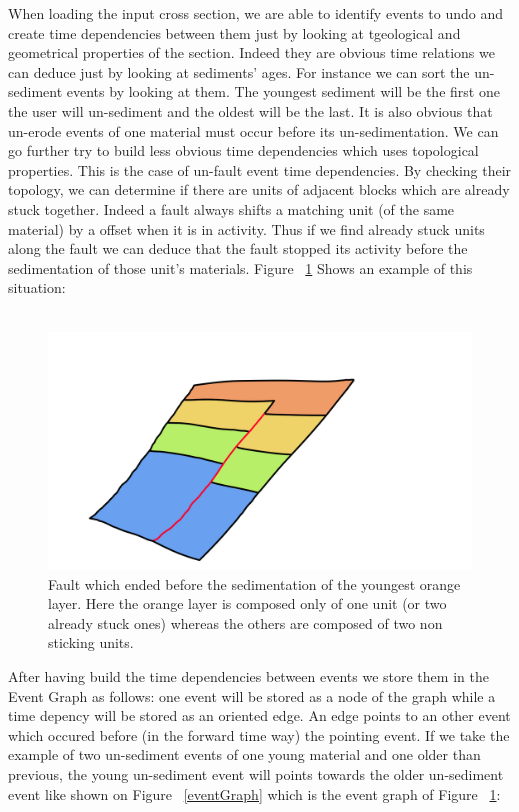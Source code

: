 \documentclass[12pt, a4paper]{report} %
\begin{document}
When loading the input cross section, we are able to identify events to undo and create time dependencies between them just by looking at tgeological and geometrical properties of the section. Indeed they are obvious time relations we can deduce just by looking at sediments' ages. For instance we can sort the un-sediment events by looking at them. The youngest sediment will be the first one the user will un-sediment and the oldest will be the last. It is also obvious that un-erode events of one material must occur before its un-sedimentation. 
We can go further try to build less obvious time dependencies which uses topological properties. This is the case of un-fault event time dependencies. By checking their topology, we can determine if there are units of adjacent blocks which are already stuck together. Indeed a fault always shifts a matching unit (of the same material) by a offset when it is in activity. Thus if we find already stuck units along the fault we can deduce that the fault stopped its activity before the sedimentation of those unit's materials. Figure ~\ref{faultstick} Shows an example of this situation:\\\\
	\begin{figure}[H]
	\centering
	\includegraphics[scale=0.5]{unFaultSedDescription.png}
	\caption{Fault which ended before the sedimentation of the youngest orange layer. Here the orange layer is composed only of one unit (or two already stuck ones) whereas the others are composed of two non sticking units.}
	\label{faultstick}
	\end{figure}
	
After having build the time dependencies between events we store them in the Event Graph as follows:
one event will be stored as a node of the graph while a time depency will be stored as an oriented edge. An edge points to an other event which occured before (in the forward time way) the pointing event. If we take the example of two un-sediment events of one young material and one older than previous, the young un-sediment event will points towards the older un-sediment event like shown on Figure ~\ref{eventGraph} which is the event graph of Figure ~\ref{faultstick}:
\end{document}
